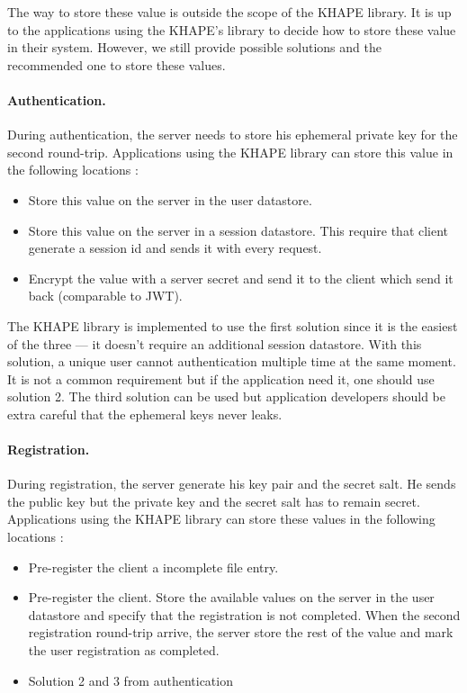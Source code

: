 ﻿\documentclass[../report.tex]{subfiles}
\begin{document}
The way to store these value is outside the scope of the KHAPE library. It is up to the applications using the KHAPE's library to decide how to store these value in their system. However, we still provide possible solutions and the recommended one to store these values.

\paragraph{Authentication.}
During authentication, the server needs to store his ephemeral private key for the second round-trip. Applications using the KHAPE library can store this value in the following locations :

\begin{itemize}
 \item Store this value on the server in the user datastore.
 \item Store this value on the server in a session datastore. This require that client generate a session id and sends it with every request.
 \item Encrypt the value with a server secret and send it to the client which send it back (comparable to JWT).
\end{itemize}

The KHAPE library is implemented to use the first solution since it is the easiest of the three --- it doesn't require an additional session datastore. With this solution, a unique user cannot authentication multiple time at the same moment. It is not a common requirement but if the application need it, one should use solution 2.
The third solution can be used but application developers should be extra careful that the ephemeral keys never leaks.

 
\paragraph{Registration.}
During registration, the server generate his key pair and the secret salt. He sends the public key but the private key and the secret salt has to remain secret. Applications using the KHAPE library can store these values in the following locations :

\begin{itemize}
 \item Pre-register the client a incomplete file entry.
 \item Pre-register the client. Store the available values on the server in the user datastore and specify that the registration is not completed. When the second registration round-trip arrive, the server store the rest of the value and mark the user registration as completed.
 \item Solution 2 and 3 from authentication
\end{itemize}
\end{document}
